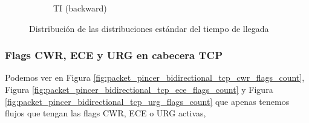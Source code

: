 \begin{figure}[H]
\begin{subfigure}[b]{0.26\textwidth}
        \caption{TI (backward)}
    \end{subfigure}
    \hfill
       \caption{Distribución de las distribuciones estándar del tiempo de llegada}
       \label{fig:packet_pincer_inter_arrival_time_std}
\end{figure}

\subsubsection{Flags CWR, ECE y URG en cabecera TCP}

Podemos ver en Figura \ref{fig:packet_pincer_bidirectional_tcp_cwr_flags_count}, Figura \ref{fig:packet_pincer_bidirectional_tcp_ece_flags_count} y Figura \ref{fig:packet_pincer_bidirectional_tcp_urg_flags_count} que apenas tenemos flujos que tengan las flags CWR, ECE o URG activas,

